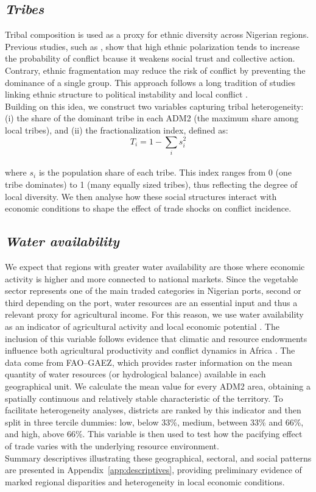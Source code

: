 \subsection{\textit{Tribes}} 
Tribal composition is used as a proxy for ethnic diversity across Nigerian regions. Previous studies, such as \textcite{montalvo2005ethnic, fearon2003ethnic}, show that high ethnic polarization tends to increase the probability of conflict bcause it weakens social trust and collective action. Contrary, ethnic fragmentation may reduce the risk of conflict by preventing the dominance of a single group. This approach follows a long tradition of studies linking ethnic structure to political instability and local conflict \parencite{fearon2003ins, michalopoulos2013pre}.\\
Building on this idea, we construct two variables capturing tribal heterogeneity: (i) the share of the dominant tribe in each ADM2 (the maximum share among local tribes), and (ii) the fractionalization index, defined as: \\
\begin{equation}
	T_i = 1 - \sum_i s_i^2
\end{equation}\\
where $s_i$ is the population share of each tribe. This index ranges from 0 (one tribe dominates) to 1 (many equally sized tribes), thus reflecting the degree of local diversity. We then analyse how these social structures interact with economic conditions to shape the effect of trade shocks on conflict incidence.\\

\subsection{\textit{Water availability}}
We expect that regions with greater water availability are those where economic activity is higher and more connected to national markets. Since the vegetable sector represents one of the main traded categories in Nigerian ports, second or third depending on the port, water resources are an essential input and thus a relevant proxy for agricultural income. For this reason, we use water availability as an indicator of agricultural activity and local economic potential \parencite{FAO_GAEZ_2020_dataset}. The inclusion of this variable follows evidence that climatic and resource endowments influence both agricultural productivity and conflict dynamics in Africa \parencite{burke2015climate}.
The data come from FAO–GAEZ, which provides raster information on the mean quantity of water resources (or hydrological balance) available in each geographical unit. We calculate the mean value for every ADM2 area, obtaining a spatially continuous and relatively stable characteristic of the territory. To facilitate heterogeneity analyses, districts are ranked by this indicator and then split in three tercile dummies: low, below 33\%, medium, between 33\% and 66\%, and high, above 66\%. This variable is then used to test how the pacifying effect of trade varies with the underlying resource environment.\\ 

Summary descriptives illustrating these geographical, sectoral, and social patterns are presented in Appendix~\ref{app:descriptives}, providing preliminary evidence of marked regional disparities and heterogeneity in local economic conditions.